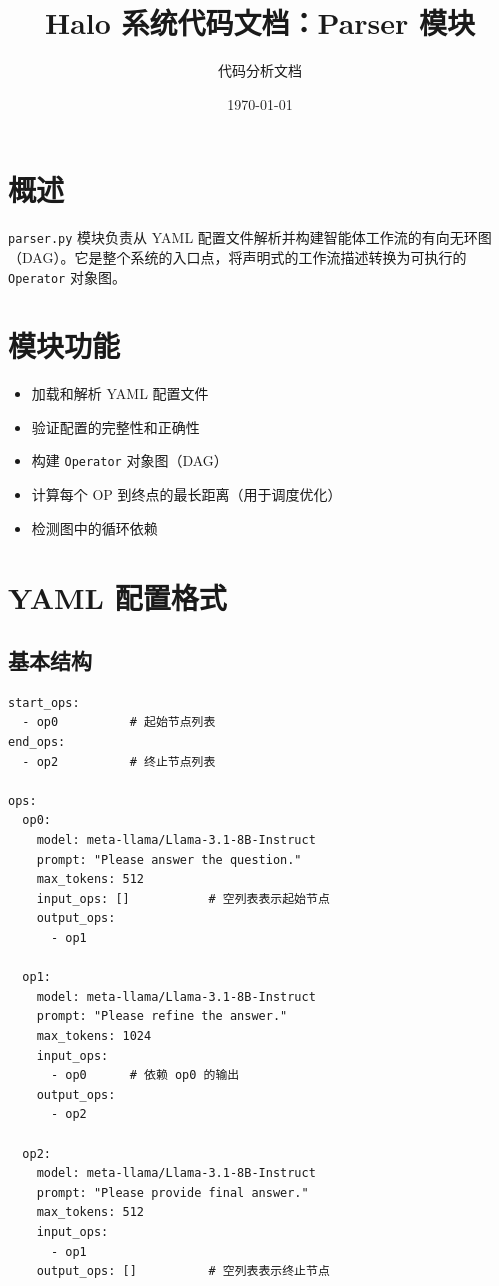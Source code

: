 \documentclass[12pt,a4paper]{article}
\title{Halo 系统代码文档：Parser 模块}
\author{代码分析文档}
\date{\today}
\begin{document}
\maketitle

\tableofcontents
\newpage

\section{概述}

\texttt{parser.py} 模块负责从 YAML 配置文件解析并构建智能体工作流的有向无环图（DAG）。它是整个系统的入口点，将声明式的工作流描述转换为可执行的 \texttt{Operator} 对象图。

\section{模块功能}

\begin{itemize}
    \item 加载和解析 YAML 配置文件
    \item 验证配置的完整性和正确性
    \item 构建 \texttt{Operator} 对象图（DAG）
    \item 计算每个 OP 到终点的最长距离（用于调度优化）
    \item 检测图中的循环依赖
\end{itemize}

\section{YAML 配置格式}

\subsection{基本结构}

\begin{lstlisting}
start_ops:
  - op0          # 起始节点列表
end_ops:
  - op2          # 终止节点列表

ops:
  op0:
    model: meta-llama/Llama-3.1-8B-Instruct
    prompt: "Please answer the question."
    max_tokens: 512
    input_ops: []           # 空列表表示起始节点
    output_ops:
      - op1
    
  op1:
    model: meta-llama/Llama-3.1-8B-Instruct
    prompt: "Please refine the answer."
    max_tokens: 1024
    input_ops:
      - op0      # 依赖 op0 的输出
    output_ops:
      - op2
    
  op2:
    model: meta-llama/Llama-3.1-8B-Instruct
    prompt: "Please provide final answer."
    max_tokens: 512
    input_ops:
      - op1
    output_ops: []          # 空列表表示终止节点
\end{lstlisting}
\end{document}
